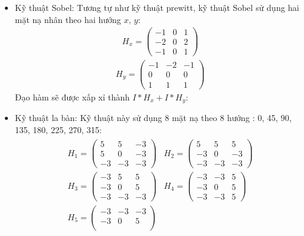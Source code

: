 \documentclass[12pt, oneside, a4paper]{book}
\begin{document}
\begin{itemize}
\item Kỹ thuật Sobel:
Tương tự như kỹ thuật prewitt, kỹ thuật Sobel sử dụng hai mặt nạ nhân theo hai hướng $x,\, y$:
\begin{align*}
   H_x= \begin{pmatrix}
        -1 & 0 & 1 \\
        -2 & 0 & 2  \\
        -1 & 0 & 1
    \end{pmatrix}
\end{align*}
\begin{align*}
   H_y= \begin{pmatrix}
        -1 & -2 & -1 \\
        0 & 0 & 0  \\
        1 & 1 & 1
    \end{pmatrix}
\end{align*}
Đạo hàm sẽ được xấp xỉ thành $I\ast H_x+I\ast H_y$:
\item Kỹ thuật la bàn: 
Kỹ thuật này sử dụng 8 mặt nạ theo 8 hướng : 0\degree, 45\degree, 90\degree, 135\degree, 180\degree, 225\degree, 270\degree, 315\degree: 
\begin{align*}
    \begin{matrix}
       H_1= \begin{pmatrix}
        5 & 5 & -3 \\
        5 & 0 & -3  \\
        -3 & -3 & -3
    \end{pmatrix} & H_2=\begin{pmatrix}
        5 & 5 & 5 \\
        -3 & 0 & -3  \\
        -3 & -3 & -3
    \end{pmatrix} \\
        H_3=\begin{pmatrix}
        -3 & 5 & 5 \\
        -3 & 0 & 5  \\
        -3 & -3 & -3
    \end{pmatrix} & H_4=\begin{pmatrix}
        -3 & -3 & 5 \\
        -3 & 0 & 5  \\
        -3 & -3 & 5
    \end{pmatrix}\\
       H_5= \begin{pmatrix}
        -3 & -3 & -3 \\
        -3 & 0 & 5  \\

\end{pmatrix}
\end{matrix}
\end{align*}
\end{itemize}
\end{document}
